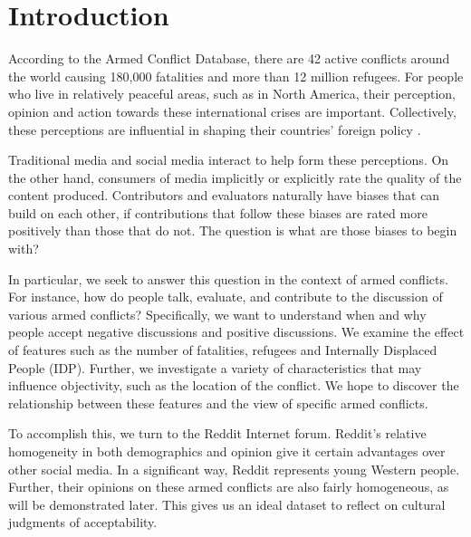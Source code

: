 \section{Introduction}
According to the Armed Conflict Database, there are 42 active conflicts around the world causing 180,000 fatalities and more than 12 million refugees. For people who live in relatively peaceful areas, such as in North America, their perception, opinion and action towards these international crises are important. Collectively, these perceptions are influential in shaping their countries' foreign policy \cite{Gelpi2009}. 

Traditional media and social media interact to help form these perceptions. On the other hand, consumers of media implicitly or explicitly rate the quality of the content produced. Contributors and evaluators naturally have biases that can build on each other, if contributions that follow these biases are rated more positively than those that do not. The question is what are those biases to begin with?

In particular, we seek to answer this question in the context of armed conflicts. For instance, how do people talk, evaluate, and contribute to the discussion of various armed conflicts? Specifically, we want to understand when and why people accept negative discussions and positive discussions. We examine the effect of features such as the number of fatalities, refugees and Internally Displaced People (IDP). Further, we  investigate a variety of characteristics that may influence objectivity, such as the location of the conflict. We hope to discover the relationship between these features and the view of specific armed conflicts.

To accomplish this, we turn to the Reddit Internet forum. Reddit's relative homogeneity in both demographics and opinion give it certain advantages over other social media. In a significant way, Reddit represents young Western people. Further, their opinions on these armed conflicts are also fairly homogeneous, as will be demonstrated later. This gives us an ideal dataset to reflect on cultural judgments of acceptability.

